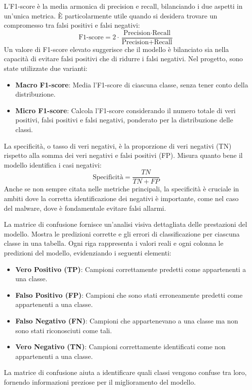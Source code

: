 L'F1-score è la media armonica di precision e recall, bilanciando i due aspetti in un'unica metrica. È particolarmente utile quando si desidera trovare un compromesso tra falsi positivi e falsi negativi:
\[
\text{F1-score} = 2 \cdot \frac{\text{Precision} \cdot \text{Recall}}{\text{Precision} + \text{Recall}}
\]
Un valore di F1-score elevato suggerisce che il modello è bilanciato sia nella capacità di evitare falsi positivi che di ridurre i falsi negativi. Nel progetto, sono state utilizzate due varianti:
\begin{itemize}
    \item \textbf{Macro F1-score}: Media l'F1-score di ciascuna classe, senza tener conto della distribuzione.
    \item \textbf{Micro F1-score}: Calcola l'F1-score considerando il numero totale di veri positivi, falsi positivi e falsi negativi, ponderato per la distribuzione delle classi.
\end{itemize}

La specificità, o tasso di veri negativi, è la proporzione di veri negativi (TN) rispetto alla somma dei veri negativi e falsi positivi (FP). Misura quanto bene il modello identifica i casi negativi:
\[
\text{Specificità} = \frac{TN}{TN + FP}
\]
Anche se non sempre citata nelle metriche principali, la specificità è cruciale in ambiti dove la corretta identificazione dei negativi è importante, come nel caso del malware, dove è fondamentale evitare falsi allarmi.

La matrice di confusione fornisce un'analisi visiva dettagliata delle prestazioni del modello. Mostra le predizioni corrette e gli errori di classificazione per ciascuna classe in una tabella. Ogni riga rappresenta i valori reali e ogni colonna le predizioni del modello, evidenziando i seguenti elementi:
\begin{itemize}
    \item \textbf{Vero Positivo (TP)}: Campioni correttamente predetti come appartenenti a una classe.
    \item \textbf{Falso Positivo (FP)}: Campioni che sono stati erroneamente predetti come appartenenti a una classe.
    \item \textbf{Falso Negativo (FN)}: Campioni che appartenevano a una classe ma non sono stati riconosciuti come tali.
    \item \textbf{Vero Negativo (TN)}: Campioni correttamente identificati come non appartenenti a una classe.
\end{itemize}
La matrice di confusione aiuta a identificare quali classi vengono confuse tra loro, fornendo informazioni preziose per il miglioramento del modello.

